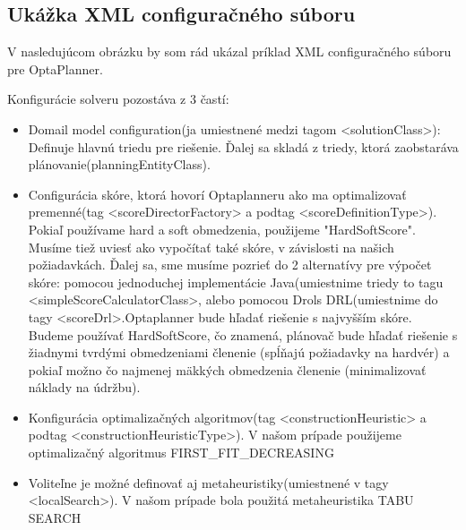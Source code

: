 \subsection{Ukážka XML configuračného súboru}
V nasledujúcom obrázku by som rád ukázal príklad XML configuračného súboru pre OptaPlanner.
    

\newpage
Konfigurácie solveru pozostáva z 3 častí: 
\begin{itemize}
\item Domail model configuration(ja umiestnené medzi tagom <solutionClass>): Definuje hlavnú triedu pre riešenie. Ďalej sa skladá z triedy, ktorá zaobstaráva plánovanie(planningEntityClass).
\item Configurácia skóre, ktorá hovorí Optaplanneru ako ma optimalizovať premenné(tag <scoreDirectorFactory> a podtag <scoreDefinitionType>). Pokiaľ používame hard a soft obmedzenia, použijeme "HardSoftScore". Musíme tiež uviesť ako vypočítať také skóre, v závislosti na našich požiadavkách. Ďalej sa, sme musíme  pozrieť do 2 alternatívy pre výpočet skóre: pomocou jednoduchej implementácie Java(umiestnime triedy to tagu <simpleScoreCalculatorClass>, alebo pomocou Drols DRL(umiestnime do tagy <scoreDrl>.Optaplanner bude hľadať riešenie s najvyšším skóre. Budeme používať HardSoftScore, čo znamená, plánovač bude hľadať riešenie s žiadnymi tvrdými obmedzeniami členenie (spĺňajú požiadavky na hardvér) a pokiaľ možno čo najmenej mäkkých obmedzenia členenie (minimalizovať náklady na údržbu).
\item Konfigurácia optimalizačných algoritmov(tag <constructionHeuristic> a podtag <constructionHeuristicType>). V našom prípade použijeme optimalizačný algoritmus FIRST\_FIT\_DECREASING
\item Voliteľne je možné definovať aj metaheuristiky(umiestnené v tagy <localSearch>). V našom prípade bola použitá metaheuristika TABU SEARCH

\end{itemize}


